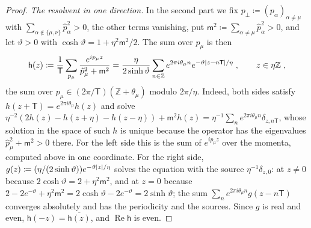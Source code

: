 \documentclass[11pt]{preprint}
\DeclarePairedDelimiter{\abs}{\lvert}{\rvert}
\numberwithin{equation}{section}
\theoremstyle{definition}
\theoremstyle{remark}
\theoremstyle{plain}
\begin{document}
\begin{proof}
\emph{The resolvent in one direction.} In the second part we fix $p_\perp \coloneqq (p_\alpha)_{\alpha \neq \mu}$ with $\sum_{\alpha \notin \{ \mu, \nu \}}\hat p_\alpha^2 > 0$, the other terms vanishing, put $\mathsf m^2 \coloneqq \sum_{\alpha \neq \mu}\hat p_\alpha^2 > 0$, and let $\vartheta > 0$ with $\cosh\vartheta = 1 + \eta^2\mathsf m^2/2$. The sum over $p_\mu$ is then
\begin{equation}\label{eq:one-direction-resolvent}
    \mathsf h(z) \coloneqq \frac{1}{\mathsf T}\sum_{p_\mu}\frac{e^{ip_\mu z}}{\hat p_\mu^2 + \mathsf m^2} = \frac{\eta}{2\sinh\vartheta}\sum_{n \in \mathbb Z}e^{2\pi i\theta_\mu n}e^{-\vartheta\abs{z - n\mathsf T}/\eta}\;,
    \qquad
    z \in \eta\mathbb Z\;,
\end{equation}
the sum over $p_\mu \in (2\pi/\mathsf T)(\mathbb Z + \theta_\mu)$ modulo $2\pi/\eta$. Indeed, both sides satisfy $h(z + \mathsf T) = e^{2\pi i\theta_\mu}h(z)$ and solve $\eta^{-2}(2h(z) - h(z + \eta) - h(z - \eta)) + \mathsf m^2h(z) = \eta^{-1}\sum_ne^{2\pi i\theta_\mu n}\delta_{z,n\mathsf T}$, whose solution in the space of such $h$ is unique because the operator has the eigenvalues $\hat p_\mu^2 + \mathsf m^2 > 0$ there. For the left side this is the sum of $e^{ip_\mu z}$ over the momenta, computed above in one coordinate. For the right side, $g(z) \coloneqq (\eta/(2\sinh\vartheta))e^{-\vartheta\abs{z}/\eta}$ solves the equation with the source $\eta^{-1}\delta_{z,0}$: at $z \neq 0$ because $2\cosh\vartheta = 2 + \eta^2\mathsf m^2$, and at $z = 0$ because $2 - 2e^{-\vartheta} + \eta^2\mathsf m^2 = 2\cosh\vartheta - 2e^{-\vartheta} = 2\sinh\vartheta$; the sum $\sum_ne^{2\pi i\theta_\mu n}g(z - n\mathsf T)$ converges absolutely and has the periodicity and the sources. Since $g$ is real and even, $\mathsf h(-z) = \overline{\mathsf h(z)}$, and $\operatorname{Re}\mathsf h$ is even.


\end{proof}
\end{document}
